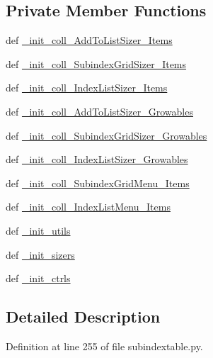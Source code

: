 \subsection*{Private Member Functions}
\begin{CompactItemize}
\item 
def \hyperlink{classsubindextable_1_1EditingPanel_81852f5b97f68e5709560a4ff0d285fe}{\_\-init\_\-coll\_\-Add\-To\-List\-Sizer\_\-Items}
\item 
def \hyperlink{classsubindextable_1_1EditingPanel_73356427a8bd3b439bda45420136686a}{\_\-init\_\-coll\_\-Subindex\-Grid\-Sizer\_\-Items}
\item 
def \hyperlink{classsubindextable_1_1EditingPanel_91152d27972ad900edd7dbd3722f04e9}{\_\-init\_\-coll\_\-Index\-List\-Sizer\_\-Items}
\item 
def \hyperlink{classsubindextable_1_1EditingPanel_266b256cfd896e3a42c23f531de93121}{\_\-init\_\-coll\_\-Add\-To\-List\-Sizer\_\-Growables}
\item 
def \hyperlink{classsubindextable_1_1EditingPanel_79c7c994481b15c024ba65a5cab5185d}{\_\-init\_\-coll\_\-Subindex\-Grid\-Sizer\_\-Growables}
\item 
def \hyperlink{classsubindextable_1_1EditingPanel_59497a2a5eae0d061db737c27b459ede}{\_\-init\_\-coll\_\-Index\-List\-Sizer\_\-Growables}
\item 
def \hyperlink{classsubindextable_1_1EditingPanel_9a9885a49704cbb3c71d0ab2baa96155}{\_\-init\_\-coll\_\-Subindex\-Grid\-Menu\_\-Items}
\item 
def \hyperlink{classsubindextable_1_1EditingPanel_4492082020058408801f412abcf59320}{\_\-init\_\-coll\_\-Index\-List\-Menu\_\-Items}
\item 
def \hyperlink{classsubindextable_1_1EditingPanel_ad72ddfcc90a6d851466d24a9070e9d2}{\_\-init\_\-utils}
\item 
def \hyperlink{classsubindextable_1_1EditingPanel_223610e27a64a602776d6f35ca8040ff}{\_\-init\_\-sizers}
\item 
def \hyperlink{classsubindextable_1_1EditingPanel_d8ad09b717e5c11919397a2929452b36}{\_\-init\_\-ctrls}
\end{CompactItemize}


\subsection{Detailed Description}




Definition at line 255 of file subindextable.py.


